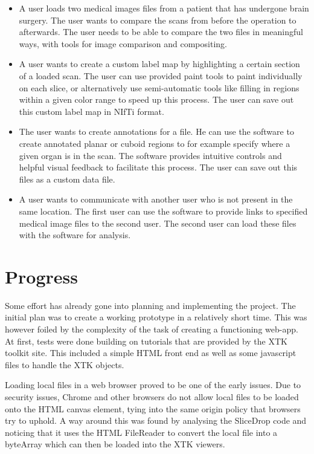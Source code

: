 \documentclass[a4paper,11pt,titlepage]{article}
\begin{document}
\begin{itemize}

\item A user loads two medical images files from a patient that has undergone brain surgery. The user wants to compare the scans from before the operation to afterwards. The user needs to be able to compare the two files in meaningful ways, with tools for image comparison and compositing.

\item A user wants to create a custom label map by highlighting a certain section of a loaded scan. The user can use provided paint tools to paint individually on each slice, or alternatively use semi-automatic tools like filling in regions within a given color range to speed up this process. The user can save out this custom label map in NIfTi format.

\item The user wants to create annotations for a file. He can use the software to create annotated planar or cuboid regions to for example specify where a given organ is in the scan. The software provides intuitive controls and helpful visual feedback to facilitate this process. The user can save out this files as a custom data file.

\item A user wants to communicate with another user who is not present in the same location. The first user can use the software to provide links to specified medical image files to the second user. The second user can load these files with the software for analysis.

\end{itemize}

\section{Progress}

Some effort has already gone into planning and implementing the project. The initial plan was to create a working prototype in a relatively short time. This was however foiled by the complexity of the task of creating a functioning web-app. At first, tests were done building on tutorials that are provided by the XTK toolkit site. This included a simple HTML front end as well as some javascript files to handle the XTK objects.

Loading local files in a web browser proved to be one of the early issues. Due to security issues, Chrome and other browsers do not allow local files to be loaded onto the HTML canvas element, tying into the same origin policy that browsers try to uphold. A way around this was found by analysing the SliceDrop code and noticing that it uses the HTML FileReader to convert the local file into a byteArray which can then be loaded into the XTK viewers.
\end{document}
